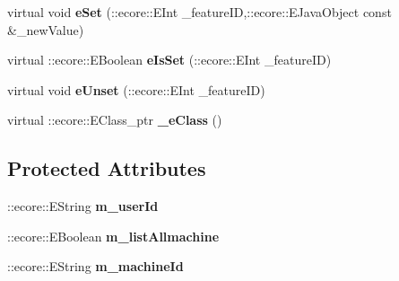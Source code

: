 \begin{DoxyCompactItemize}
\item 
\hypertarget{classUMS__Data_1_1ListMachineOptions_ab521c5e9a3128a2de1f974dcf3b71180}{
virtual void {\bfseries eSet} (::ecore::EInt \_\-featureID,::ecore::EJavaObject const \&\_\-newValue)}
\label{classUMS__Data_1_1ListMachineOptions_ab521c5e9a3128a2de1f974dcf3b71180}

\item 
\hypertarget{classUMS__Data_1_1ListMachineOptions_a2273b7985d63b35199b49bbf4d50d22b}{
virtual ::ecore::EBoolean {\bfseries eIsSet} (::ecore::EInt \_\-featureID)}
\label{classUMS__Data_1_1ListMachineOptions_a2273b7985d63b35199b49bbf4d50d22b}

\item 
\hypertarget{classUMS__Data_1_1ListMachineOptions_aa8e21ad5830c2d5d59e33ae63c092269}{
virtual void {\bfseries eUnset} (::ecore::EInt \_\-featureID)}
\label{classUMS__Data_1_1ListMachineOptions_aa8e21ad5830c2d5d59e33ae63c092269}

\item 
\hypertarget{classUMS__Data_1_1ListMachineOptions_adb1dae8175be49dab680534b3e9d0fc3}{
virtual ::ecore::EClass\_\-ptr {\bfseries \_\-eClass} ()}
\label{classUMS__Data_1_1ListMachineOptions_adb1dae8175be49dab680534b3e9d0fc3}

\end{DoxyCompactItemize}
\subsection*{Protected Attributes}
\begin{DoxyCompactItemize}
\item 
\hypertarget{classUMS__Data_1_1ListMachineOptions_ae14d730b3c3896af684f15ecfb68391c}{
::ecore::EString {\bfseries m\_\-userId}}
\label{classUMS__Data_1_1ListMachineOptions_ae14d730b3c3896af684f15ecfb68391c}

\item 
\hypertarget{classUMS__Data_1_1ListMachineOptions_a94c4f0f5f3f7fec570b55e87dd998875}{
::ecore::EBoolean {\bfseries m\_\-listAllmachine}}
\label{classUMS__Data_1_1ListMachineOptions_a94c4f0f5f3f7fec570b55e87dd998875}

\item 
\hypertarget{classUMS__Data_1_1ListMachineOptions_aa5d20de3b5c14413d4f4c98f535fe48d}{
::ecore::EString {\bfseries m\_\-machineId}}
\label{classUMS__Data_1_1ListMachineOptions_aa5d20de3b5c14413d4f4c98f535fe48d}

\end{DoxyCompactItemize}


